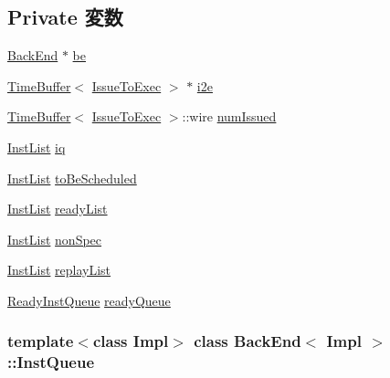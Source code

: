 \subsection*{Private 変数}
\begin{DoxyCompactItemize}
\item 
\hyperlink{classBackEnd}{BackEnd} $\ast$ \hyperlink{classBackEnd_1_1InstQueue_a84f815aa1fa864ba2e6d75f5ad2b52d1}{be}
\item 
\hyperlink{classTimeBuffer}{TimeBuffer}$<$ \hyperlink{structBackEnd_1_1SizeStruct}{IssueToExec} $>$ $\ast$ \hyperlink{classBackEnd_1_1InstQueue_afc6d5236e885a5de7bfb9727fd01d6ee}{i2e}
\item 
\hyperlink{classTimeBuffer}{TimeBuffer}$<$ \hyperlink{structBackEnd_1_1SizeStruct}{IssueToExec} $>$::wire \hyperlink{classBackEnd_1_1InstQueue_ac80a68748a283f0c7df3bd3eb19be49b}{numIssued}
\item 
\hyperlink{classstd_1_1list}{InstList} \hyperlink{classBackEnd_1_1InstQueue_a22cf4c165453d89ad7db9e099d30f66e}{iq}
\item 
\hyperlink{classstd_1_1list}{InstList} \hyperlink{classBackEnd_1_1InstQueue_ad2696412af240d7ad2a5f9a4bf3157ef}{toBeScheduled}
\item 
\hyperlink{classstd_1_1list}{InstList} \hyperlink{classBackEnd_1_1InstQueue_a008a1081076d1f3d6d0077ca5ddde1ad}{readyList}
\item 
\hyperlink{classstd_1_1list}{InstList} \hyperlink{classBackEnd_1_1InstQueue_ad94e34caaaf370c845966bd354354136}{nonSpec}
\item 
\hyperlink{classstd_1_1list}{InstList} \hyperlink{classBackEnd_1_1InstQueue_a8ca9831b0a85813e19007e433bddc163}{replayList}
\item 
\hyperlink{classBackEnd_1_1InstQueue_a60636ae8f3b649078c4f1bdd3b20dcad}{ReadyInstQueue} \hyperlink{classBackEnd_1_1InstQueue_ab9e4e533fd6d46fc4955cbcf0a4d28dc}{readyQueue}
\end{DoxyCompactItemize}
\subsubsection*{template$<$class Impl$>$ class BackEnd$<$ Impl $>$::InstQueue}



